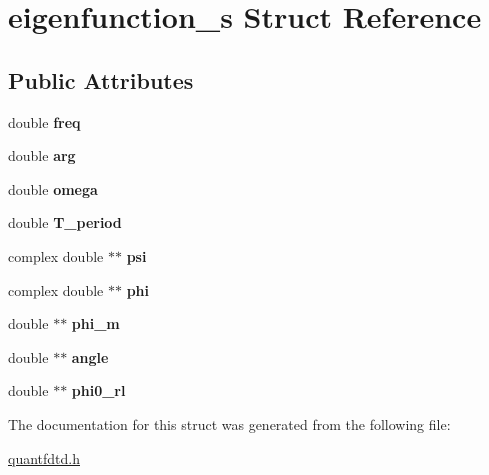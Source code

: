 \hypertarget{structeigenfunction__s}{\section{eigenfunction\-\_\-s Struct Reference}
\label{structeigenfunction__s}
}
\subsection*{Public Attributes}
\begin{DoxyCompactItemize}
\item 
\hypertarget{structeigenfunction__s_a13891266ad6a49c553297cdefdfad23a}{double {\bfseries freq}}\label{structeigenfunction__s_a13891266ad6a49c553297cdefdfad23a}

\item 
\hypertarget{structeigenfunction__s_a42b1a653760dadfc51009ba40d24e79e}{double {\bfseries arg}}\label{structeigenfunction__s_a42b1a653760dadfc51009ba40d24e79e}

\item 
\hypertarget{structeigenfunction__s_a1ff115b04f7cf33d34cec64db9de2206}{double {\bfseries omega}}\label{structeigenfunction__s_a1ff115b04f7cf33d34cec64db9de2206}

\item 
\hypertarget{structeigenfunction__s_a6d84ccbbcbd9e9b2e0928267d7bb46a2}{double {\bfseries T\-\_\-period}}\label{structeigenfunction__s_a6d84ccbbcbd9e9b2e0928267d7bb46a2}

\item 
\hypertarget{structeigenfunction__s_ac0a1c7ebe0043f087d3a42c2a3333298}{complex double $\ast$$\ast$ {\bfseries psi}}\label{structeigenfunction__s_ac0a1c7ebe0043f087d3a42c2a3333298}

\item 
\hypertarget{structeigenfunction__s_a1afff597fe22b14f3fd3b6563375dab7}{complex double $\ast$$\ast$ {\bfseries phi}}\label{structeigenfunction__s_a1afff597fe22b14f3fd3b6563375dab7}

\item 
\hypertarget{structeigenfunction__s_a8481483126b498fa3a60d69f8aade941}{double $\ast$$\ast$ {\bfseries phi\-\_\-m}}\label{structeigenfunction__s_a8481483126b498fa3a60d69f8aade941}

\item 
\hypertarget{structeigenfunction__s_a0685921af8bc0902a1d774dcdd99d89f}{double $\ast$$\ast$ {\bfseries angle}}\label{structeigenfunction__s_a0685921af8bc0902a1d774dcdd99d89f}

\item 
\hypertarget{structeigenfunction__s_a1ebf67f2c9b65b6082b616168c2efd1f}{double $\ast$$\ast$ {\bfseries phi0\-\_\-rl}}\label{structeigenfunction__s_a1ebf67f2c9b65b6082b616168c2efd1f}

\end{DoxyCompactItemize}


The documentation for this struct was generated from the following file\-:\begin{DoxyCompactItemize}
\item 
\hyperlink{quantfdtd_8h}{quantfdtd.\-h}\end{DoxyCompactItemize}
